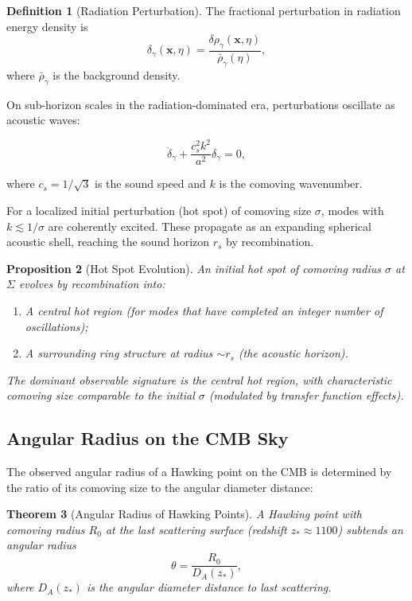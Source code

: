 \documentclass[11pt,a4paper]{article}
\theoremstyle{plain}
\newtheorem{theorem}{Theorem}[section]
\newtheorem{proposition}[theorem]{Proposition}
\theoremstyle{definition}
\newtheorem{definition}[theorem]{Definition}
\theoremstyle{remark}
\begin{document}
\begin{definition}[Radiation Perturbation]\label{def:rad_perturbation}
The fractional perturbation in radiation energy density is
\begin{equation}
    \delta_\gamma(\bm{x}, \eta) = \frac{\delta\rho_\gamma(\bm{x}, \eta)}{\bar{\rho}_\gamma(\eta)},
\end{equation}
where $\bar{\rho}_\gamma$ is the background density.
\end{definition}

On sub-horizon scales in the radiation-dominated era, perturbations oscillate as acoustic waves:

\begin{equation}\label{eq:acoustic_oscillation}
    \ddot{\delta}_\gamma + \frac{c_s^2 k^2}{a^2} \delta_\gamma = 0,
\end{equation}

where $c_s = 1/\sqrt{3}$ is the sound speed and $k$ is the comoving wavenumber.

For a localized initial perturbation (hot spot) of comoving size $\sigma$, modes with $k \lesssim 1/\sigma$ are coherently excited. These propagate as an expanding spherical acoustic shell, reaching the sound horizon $r_s$ by recombination.

\begin{proposition}[Hot Spot Evolution]\label{prop:hotspot_evolution}
An initial hot spot of comoving radius $\sigma$ at $\Sigma$ evolves by recombination into:
\begin{enumerate}
    \item A central hot region (for modes that have completed an integer number of oscillations);
    \item A surrounding ring structure at radius $\sim r_s$ (the acoustic horizon).
\end{enumerate}
The dominant observable signature is the central hot region, with characteristic comoving size comparable to the initial $\sigma$ (modulated by transfer function effects).
\end{proposition}

\subsection{Angular Radius on the CMB Sky}

The observed angular radius of a Hawking point on the CMB is determined by the ratio of its comoving size to the angular diameter distance:

\begin{theorem}[Angular Radius of Hawking Points]\label{thm:angular_radius}
A Hawking point with comoving radius $R_0$ at the last scattering surface (redshift $z_\ast \approx 1100$) subtends an angular radius
\begin{equation}\label{eq:theta_R0_DA}
    \theta = \frac{R_0}{D_A(z_\ast)},
\end{equation}
where $D_A(z_\ast)$ is the angular diameter distance to last scattering.
\end{theorem}
\end{document}
